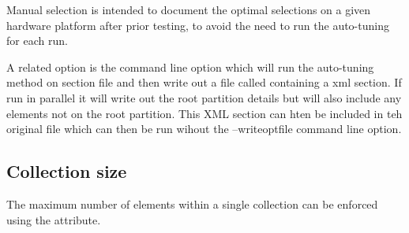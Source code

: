 Manual selection is intended to document the optimal selections on a given
hardware platform after  prior testing, to avoid the need to run the
auto-tuning for each run.

A related option is the  command line option which
will run the auto-tuning method on section file 
and then write out a file called  containing a
 xml section. If run in parallel it will write out
the root partition details but will also include any elements not on
the root partition. This XML section can hten be included in teh
original  file which can then be run wihout the
--writeoptfile command line option.


\subsection{Collection size}
The maximum number of elements within a single collection can be
enforced using the  attribute.

